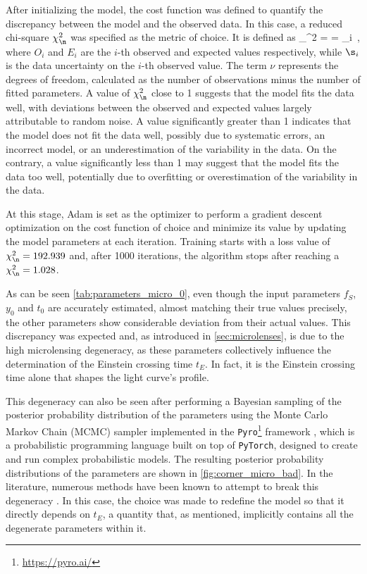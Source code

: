After initializing the model, the cost function was defined to quantify the discrepancy between the model and the observed data. In this case, a reduced chi-square $\chi_\n^2$ was specified as the metric of choice. It is defined as
\be
\label{eq:5.01}
\chi_\nu^2 =  =  \sum\limits_{i}  \,,
\ee
where $O_i$ and $E_i$ are the $i$-th observed and expected values respectively, while $\s_i$ is the data uncertainty on the $i$-th observed value. The term $\nu$ represents the degrees of freedom, calculated as the number of observations minus the number of fitted parameters. A value of $\chi_\n^2$ close to 1 suggests that the model fits the data well, with deviations between the observed and expected values largely attributable to random noise. A value significantly greater than 1 indicates that the model does not fit the data well, possibly due to systematic errors, an incorrect model, or an underestimation of the variability in the data. On the contrary, a value significantly less than 1 may suggest that the model fits the data too well, potentially due to overfitting or overestimation of the variability in the data.

At this stage, Adam \citep{kingma_adam_2017} is set as the optimizer to perform a gradient descent optimization on the cost function of choice and minimize its value by updating the model parameters at each iteration. Training starts with a loss value of $\chi_\n^2 = 192.939$ and, after 1000 iterations, the algorithm stops after reaching a $\chi_\n^2 = 1.028$.

As can be seen \cref{tab:parameters_micro_0}, even though the input parameters $f_S$, $y_0$ and $t_0$ are accurately estimated, almost matching their true values precisely, the other parameters show considerable deviation from their actual values. This discrepancy was expected and, as introduced in \cref{sec:microlenses}, is due to the high microlensing degeneracy, as these parameters collectively influence the determination of the Einstein crossing time $t_E$. In fact, it is the Einstein crossing time alone that shapes the light curve's profile.

This degeneracy can also be seen after performing a Bayesian sampling of the posterior probability distribution of the parameters using the Monte Carlo Markov Chain (MCMC) sampler implemented in the \texttt{Pyro}\footnote{\url{https://pyro.ai/}} framework \citep{bingham_pyro_2018}, which is a probabilistic programming language built on top of \texttt{PyTorch}, designed to create and run complex probabilistic models. The resulting posterior probability distributions of the parameters are shown in \cref{fig:corner_micro_bad}. In the literature, numerous methods have been known to attempt to break this degeneracy \citep{lee_microlensing_2017}. In this case, the choice was made to redefine the model so that it directly depends on $t_E$, a quantity that, as mentioned, implicitly contains all the degenerate parameters within it.

